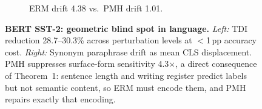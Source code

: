 \begin{figure}[t]
\begin{subfigure}[b]{0.48\textwidth}
\caption{ERM drift 4.38 vs.\ PMH drift 1.01.}
\end{subfigure}
\caption{\textbf{BERT SST-2: geometric blind spot in language.}
\emph{Left:} TDI reduction 28.7--30.3\% across perturbation levels at $<$1\,pp accuracy cost.
\emph{Right:} Synonym paraphrase drift as mean CLS displacement.
PMH suppresses surface-form sensitivity 4.3$\times$, a direct consequence of
Theorem~1: sentence length and writing register predict labels but not semantic content,
so ERM must encode them, and PMH repairs exactly that encoding.}
\label{fig:a4}
\end{figure}
